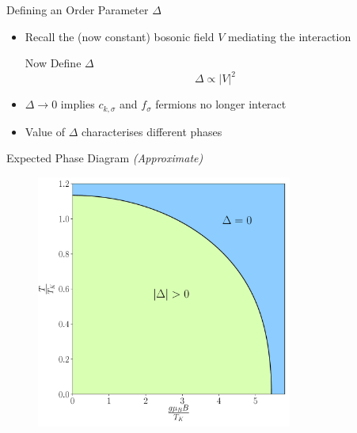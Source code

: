 \documentclass[13pt]{beamer}
\begin{document}
  \begin{frame}{Defining an Order Parameter $ \Delta $}

  \begin{itemize}
    \item Recall the (now constant) bosonic field $ V $ mediating the interaction

  \begin{block}{Now Define $ \Delta $}
  $$ \Delta \propto | V |^{2} $$
  \end{block}

    \item $ \Delta \rightarrow 0 $ implies $ c_{k, \sigma} $ and $ f_{\sigma} $ fermions no longer interact
    \item Value of $ \Delta $ characterises different phases
  \end{itemize}

  \end{frame}

  \begin{frame}{Expected Phase Diagram \textit{(Approximate)}}

  \begin{figure}
    \centering
    \includegraphics[width=0.75\textwidth]{Figures/phase_diagram.pdf}
  \end{figure}

  \end{frame}
\end{document}
